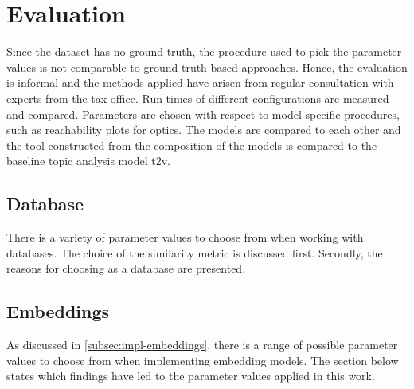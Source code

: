 \chapter{Evaluation}\label{ch:evaluation}

Since the dataset has no ground truth, the procedure used to pick the parameter values is not comparable to ground truth-based approaches.
Hence, the evaluation is informal and the methods applied have arisen from regular consultation with experts from the tax office.
Run times of different configurations are measured and compared.
Parameters are chosen with respect to model-specific procedures, such as reachability plots for \ac{optics}.
The models are compared to each other and 
the tool constructed from the composition of the models is compared to the baseline topic analysis model \ac{t2v}.


\section{Database}\label{sec:eval-db}
There is a variety of parameter values to choose from when working with databases.
The choice of the similarity metric is discussed first.
Secondly, the reasons for choosing \databaseName{} as a database are presented.

 

 

 
 
\section{Embeddings}\label{sec:eval-embeddings}
As discussed in \autoref{subsec:impl-embeddings}, there is a range of possible parameter values to choose from when implementing embedding models.
The section below states which findings have led to the parameter values applied in this work.















